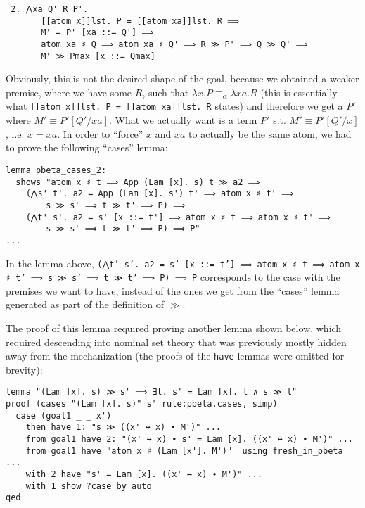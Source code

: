 \documentclass[a4paper, 12pt, twoside]{style/ociamthesis}
\theoremstyle{plain}
\theoremstyle{definition}
\theoremstyle{remark}
\begin{document}
\begin{verbatim}
 2. ⋀xa Q' R P'.
       [[atom x]]lst. P = [[atom xa]]lst. R ⟹
       M' = P' [xa ::= Q'] ⟹
       atom xa ♯ Q ⟹ atom xa ♯ Q' ⟹ R ≫ P' ⟹ Q ≫ Q' ⟹ 
       M' ≫ Pmax [x ::= Qmax]
\end{verbatim}

Obviously, this is not the desired shape of the goal, because we
obtained a weaker premise, where we have some \(R\), such that
\(\lambda x. P \equiv_\alpha \lambda xa. R\) (this is essentially what
\texttt{[[atom x]]lst. P = [[atom xa]]lst. R} states) and therefore we
get a \(P'\) where \(M' \equiv P'[Q'/xa]\). What we actually want is a
term \(P'\) s.t. \(M' \equiv P'[Q'/x]\), i.e. \(x = xa\). In order to
``force'' \(x\) and \(xa\) to actually be the same atom, we had to prove
the following ``cases'' lemma:

\begin{verbatim}
lemma pbeta_cases_2:
  shows "atom x ♯ t ⟹ App (Lam [x]. s) t ≫ a2 ⟹ 
    (⋀s' t'. a2 = App (Lam [x]. s') t' ⟹ atom x ♯ t' ⟹ 
        s ≫ s' ⟹ t ≫ t' ⟹ P) ⟹
    (⋀t' s'. a2 = s' [x ::= t'] ⟹ atom x ♯ t ⟹ atom x ♯ t' ⟹ 
        s ≫ s' ⟹ t ≫ t' ⟹ P) ⟹ P"
...
\end{verbatim}

In the lemma above,
\texttt{(⋀t' s'. a2 = s' [x ::= t'] ⟹ atom x ♯ t ⟹ atom x ♯ t' ⟹ s ≫ s' ⟹ t ≫ t' ⟹ P) ⟹ P}
corresponds to the case with the premises we want to have, instead of
the ones we get from the ``cases'' lemma generated as part of the
definition of \(\gg\).

The proof of this lemma required proving another lemma shown below,
which required descending into nominal set theory that was previously
mostly hidden away from the mechanization (the proofs of the
\texttt{have} lemmas were omitted for brevity):

\begin{verbatim}
lemma "(Lam [x]. s) ≫ s' ⟹ ∃t. s' = Lam [x]. t ∧ s ≫ t"
proof (cases "(Lam [x]. s)" s' rule:pbeta.cases, simp)
  case (goal1 _ _ x')
    then have 1: "s ≫ ((x' ↔ x) ∙ M')" ...
    from goal1 have 2: "(x' ↔ x) ∙ s' = Lam [x]. ((x' ↔ x) ∙ M')" ...
    from goal1 have "atom x ♯ (Lam [x']. M')"  using fresh_in_pbeta ...
    with 2 have "s' = Lam [x]. ((x' ↔ x) ∙ M')" ...
    with 1 show ?case by auto
qed
\end{verbatim}
\end{document}
